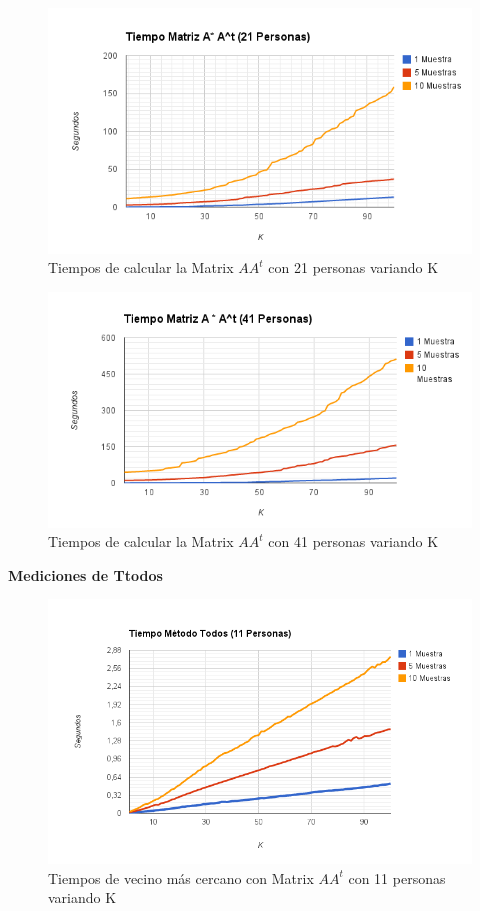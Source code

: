 \begin{figure}[H]
\includegraphics[width=1\textwidth]{img/imagef2.png}
     \caption{Tiempos de calcular la Matrix $AA^t$ con 21 personas variando K}
\end{figure}

\begin{figure}[H]
\includegraphics[width=1\textwidth]{img/imagef3.png}
     \caption{Tiempos de calcular la Matrix $AA^t$ con 41 personas variando K}
\end{figure}



\textbf{Mediciones de Ttodos }

\begin{figure}[H]
\includegraphics[width=1\textwidth]{img/imagef4.png}
     \caption{Tiempos de vecino más cercano con Matrix $AA^t$ con 11 personas variando K}
\end{figure}

